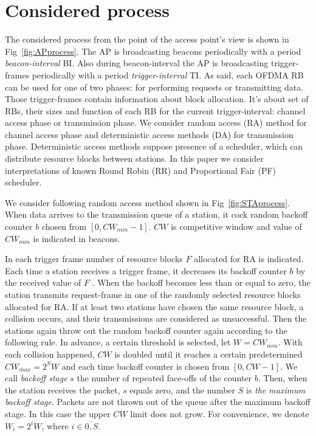 \section{Considered process}

The considered process from the point of the access point's view is shown in Fig~\ref{fig:APprocess}.
The AP is broadcasting beacons periodically with a period \textit{beacon-interval} BI.
Also during beacon-interval the AP is broadcasting trigger-frames periodically with a period \textit{trigger-interval} TI. As said, each OFDMA RB can be used for one of two phases: for performing requests or transmitting data. Those trigger-frames contain information about block allocation. It's about set of RBs, their sizes and function of each RB for the current trigger-interval: channel access phase or transmission phase. We consider random access (RA) method for channel access phase and deterministic access methods (DA) for transmission phase. Deterministic access methods suppose presence of a scheduler, which can distribute resource blocks between stations. In this paper we consider interpretations of known Round Robin (RR) and Proportional Fair (PF) scheduler.

We consider following random access method shown in Fig~\ref{fig:STAprocess}. When data arrives to the transmission queue of a station, it cock random backoff counter $b$ chosen from $[0, CW_{min} - 1]$. $CW$ is competitive window and value of $CW_{min}$ is indicated in beacons. 

In each trigger frame number of resource blocks $F$ allocated for RA is indicated. Each time a station receives a trigger frame, it decreases its backoff counter $b$ by the received value of $F$ . When the backoff becomes less than or equal to zero, the station transmits request-frame in one of the randomly selected resource blocks allocated for RA. If at least two stations have chosen the same resource block, a collision occurs, and their transmissions are considered as unsuccessful. Then the stations again throw out the random backoff counter again according to the following rule. In advance, a certain threshold is selected, let $W = CW_{min} $. With each collision happened, $CW$ is doubled until it reaches a certain predetermined $ CW_ {max} = 2 ^ {S} W$ and each time backoff counter is chosen from $[0,CW-1]$. We call \textit{backoff stage} $s$ the number of repeated face-offs of the counter $b$. Then, when the station receives the packet, $s$ equals zero, and the number $S$ is \textit{the maximum backoff stage}. Packets are not thrown out of the queue after the maximum backoff stage. In this case the upper $CW$ limit does not grow. For convenience, we denote $W_i = 2^i W $, where $i \in \overline{0, S}$.

